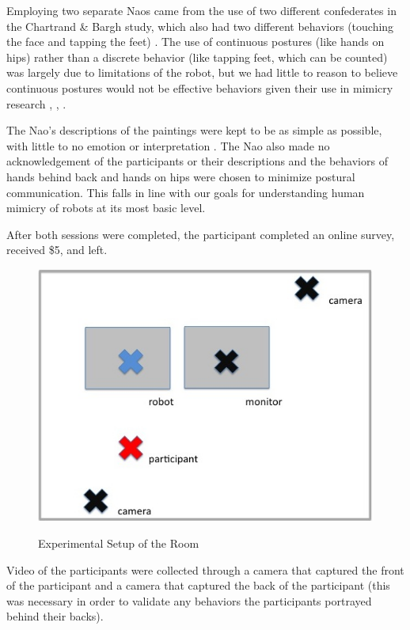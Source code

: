 \documentclass{acm_proc_article-sp}
\begin{document}
Employing two separate Naos came from the use of two different confederates in the Chartrand \& Bargh study, which also had two different behaviors (touching the face and tapping the feet) \cite{chartrand1999chameleon}. The use of continuous postures (like hands on hips) rather than a discrete behavior (like tapping feet, which can be counted) was largely due to limitations of the robot, but we had little to reason to believe continuous postures would not be effective behaviors given their use in mimicry research \cite{chartrand2013antecedents}, \cite{tia2011does}, \cite{tiedens2003power}. 

The Nao's descriptions of the paintings were kept to be as simple as possible, with little to no emotion or interpretation \cite{hofree2014bridging}. The Nao also made no acknowledgement of the participants or their descriptions and the behaviors of hands behind back and hands on hips were chosen to minimize postural communication. This falls in line with our goals for understanding human mimicry of robots at its most basic level.

After both sessions were completed, the participant completed an online survey, received \$5, and left.

\begin{figure}[t!]
\centering
 \includegraphics[width=1.05\linewidth]{images/setup.jpg}\\
 \caption{Experimental Setup of the Room}
 \label{setup} %
\end{figure}

Video of the participants were collected through a camera that captured the front of the participant and a camera that captured the back of the participant (this was necessary in order to validate any behaviors the participants portrayed behind their backs).
\end{document}
